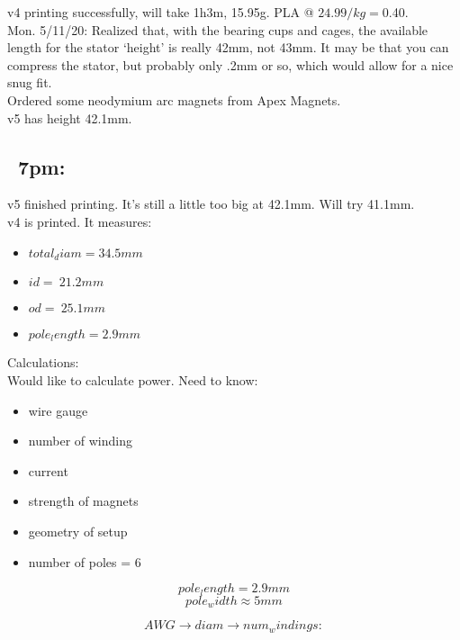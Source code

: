 \documentclass[11pt]{article} %
\begin{document}
\noindent v4 printing successfully, will take 1h3m, 15.95g. PLA @ $24.99/kg = $0.40. \\

\noindent Mon. 5/11/20: Realized that, with the bearing cups and cages, the available length for the stator ‘height’ is really 42mm, not 43mm. It may be that you can compress the stator, but probably only .2mm or so, which would allow for a nice snug fit. \\

\noindent Ordered some neodymium arc magnets from Apex Magnets. \\

\noindent v5 has height 42.1mm. \\

\subsection{~7pm:} v5 finished printing. It’s still a little too big at 42.1mm. Will try 41.1mm. \\

\noindent  v4 is printed. It measures: \\

\begin{itemize}
\item $total_diam = 34.5mm$
\item $id = ~21.2mm$
\item $od =  ~25.1mm$
\item $pole_length = 2.9mm$
\end{itemize}


\noindent Calculations: \\

\noindent Would like to calculate power. Need to know: \\

\begin{itemize}
\item wire gauge
\item number of winding
\item current
\item strength of magnets
\item geometry of setup
\item number of poles = 6
\end{itemize}

$$pole_length = 2.9mm$$
$$pole_width \approx 5mm$$

$$AWG \rightarrow diam \rightarrow num_windings:$$
\end{document}
